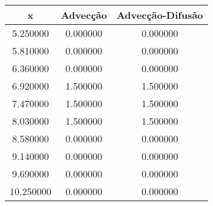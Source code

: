 \begin{tabular}{ccc}
\toprule
x & Advecção & Advecção-Difusão \\
\midrule
5.250000 & 0.000000 & 0.000000 \\
5.810000 & 0.000000 & 0.000000 \\
6.360000 & 0.000000 & 0.000000 \\
6.920000 & 1.500000 & 1.500000 \\
7.470000 & 1.500000 & 1.500000 \\
8.030000 & 1.500000 & 1.500000 \\
8.580000 & 0.000000 & 0.000000 \\
9.140000 & 0.000000 & 0.000000 \\
9.690000 & 0.000000 & 0.000000 \\
10.250000 & 0.000000 & 0.000000 \\
\bottomrule
\end{tabular}
